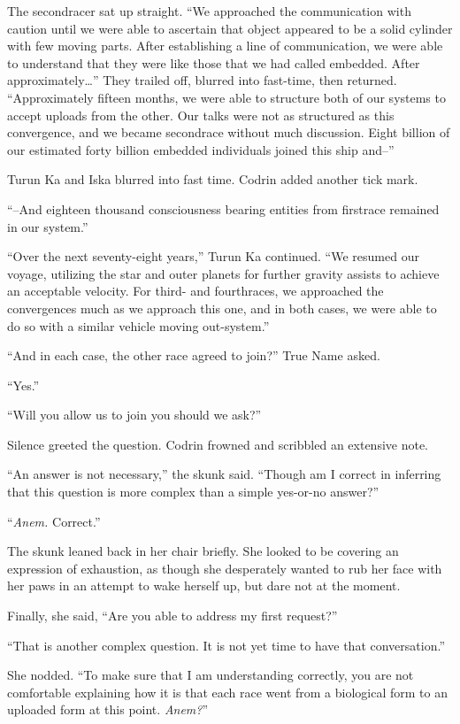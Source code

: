 The secondracer sat up straight. ``We approached the communication with caution until we were able to ascertain that object appeared to be a solid cylinder with few moving parts. After establishing a line of communication, we were able to understand that they were like those that we had called embedded. After approximately\ldots{}'' They trailed off, blurred into fast-time, then returned. ``Approximately fifteen months, we were able to structure both of our systems to accept uploads from the other. Our talks were not as structured as this convergence, and we became secondrace without much discussion. Eight billion of our estimated forty billion embedded individuals joined this ship and--''

Turun Ka and Iska blurred into fast time. Codrin added another tick mark.

``--And eighteen thousand consciousness bearing entities from firstrace remained in our system.''

``Over the next seventy-eight years,'' Turun Ka continued. ``We resumed our voyage, utilizing the star and outer planets for further gravity assists to achieve an acceptable velocity. For third- and fourthraces, we approached the convergences much as we approach this one, and in both cases, we were able to do so with a similar vehicle moving out-system.''

``And in each case, the other race agreed to join?'' True Name asked.

``Yes.''

``Will you allow us to join you should we ask?''

Silence greeted the question. Codrin frowned and scribbled an extensive note.

``An answer is not necessary,'' the skunk said. ``Though am I correct in inferring that this question is more complex than a simple yes-or-no answer?''

``\emph{Anem.} Correct.''

The skunk leaned back in her chair briefly. She looked to be covering an expression of exhaustion, as though she desperately wanted to rub her face with her paws in an attempt to wake herself up, but dare not at the moment.

Finally, she said, ``Are you able to address my first request?''

``That is another complex question. It is not yet time to have that conversation.''

She nodded. ``To make sure that I am understanding correctly, you are not comfortable explaining how it is that each race went from a biological form to an uploaded form at this point. \emph{Anem?}''

